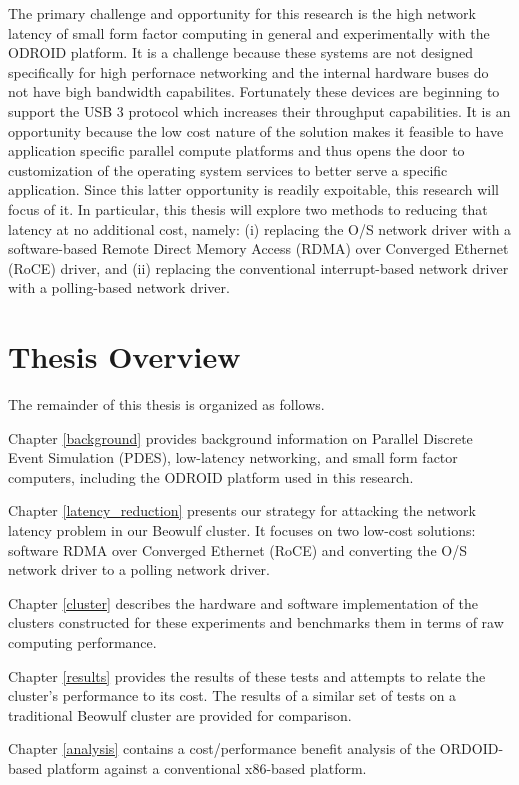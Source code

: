 \documentclass[11pt]{book}
\begin{document}
The primary challenge and opportunity for this research is the high network latency of
small form factor computing in general and experimentally with the ODROID platform.  It is
a challenge because these systems are not designed specifically for high perfornace
networking and the internal hardware buses do not have bigh bandwidth capabilites.
Fortunately these devices are beginning to support the USB 3 protocol which increases
their throughput capabilities.  It is an opportunity because the low cost nature of the
solution makes it feasible to have application specific parallel compute platforms and
thus opens the door to customization of the operating system services to better serve a
specific application.  Since this latter opportunity is readily expoitable, this research
will focus of it.  In particular, this thesis will explore two methods to reducing that
latency at no additional cost, namely: (i) replacing the O/S network driver with a
software-based Remote Direct Memory Access (RDMA) over Converged Ethernet (RoCE) driver,
and (ii) replacing the conventional interrupt-based network driver with a polling-based
network driver.

\section{Thesis Overview}

The remainder of this thesis is organized as follows.

Chapter \ref{background} provides background information on Parallel Discrete Event
Simulation (PDES), low-latency networking, and small form factor computers, including the
ODROID platform used in this research.

Chapter \ref{latency_reduction} presents our strategy for attacking the network latency
problem in our Beowulf cluster.  It focuses on two low-cost solutions: software RDMA over
Converged Ethernet (RoCE) and converting the O/S network driver to a polling network
driver. 

Chapter \ref{cluster} describes the hardware and software implementation of the clusters
constructed for these experiments and benchmarks them in terms of raw computing
performance.

Chapter \ref{results} provides the results of these tests and attempts to relate the
cluster's performance to its cost.  The results of a similar set of tests on a traditional
Beowulf cluster are provided for comparison.

Chapter \ref{analysis} contains a cost/performance benefit analysis of the ORDOID-based
platform against a conventional x86-based platform.  
\end{document}
